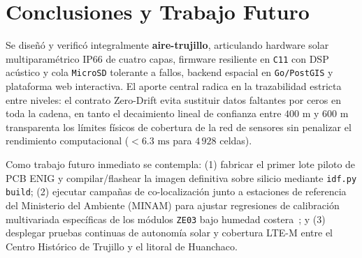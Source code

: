 \documentclass[conference]{IEEEtran}
\begin{document}
\section{Conclusiones y Trabajo Futuro}

Se diseñó y verificó integralmente \textbf{aire-trujillo}, articulando hardware solar multiparamétrico IP66 de cuatro capas, firmware resiliente en \texttt{C11} con DSP acústico y cola \texttt{MicroSD} tolerante a fallos, backend espacial en \texttt{Go/PostGIS} y plataforma web interactiva. El aporte central radica en la trazabilidad estricta entre niveles: el contrato Zero-Drift evita sustituir datos faltantes por ceros en toda la cadena, en tanto el decaimiento lineal de confianza entre $400\text{ m}$ y $600\text{ m}$ transparenta los límites físicos de cobertura de la red de sensores sin penalizar el rendimiento computacional ($<6.3\text{ ms}$ para $4\,928$ celdas).

Como trabajo futuro inmediato se contempla: (1) fabricar el primer lote piloto de PCB ENIG y compilar/flashear la imagen definitiva sobre silicio mediante \texttt{idf.py build}; (2) ejecutar campañas de co-localización junto a estaciones de referencia del Ministerio del Ambiente (MINAM) para ajustar regresiones de calibración multivariada específicas de los módulos \texttt{ZE03} bajo humedad costera~\cite{zimmerman2018machinemean}; y (3) desplegar pruebas continuas de autonomía solar y cobertura LTE-M entre el Centro Histórico de Trujillo y el litoral de Huanchaco.



\end{document}
